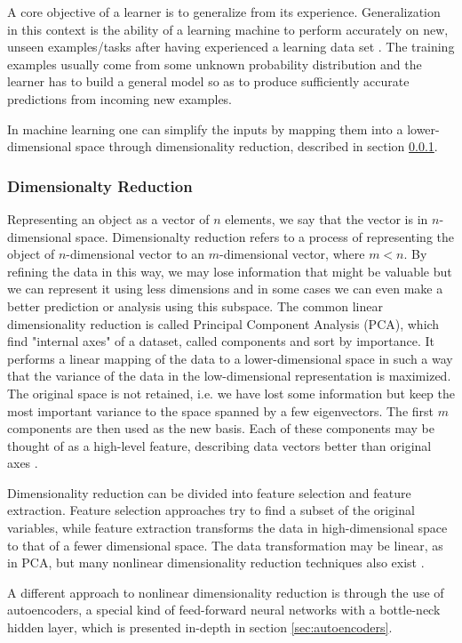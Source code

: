 A core objective of a learner is to generalize from its experience. Generalization in this context is the ability of a learning machine to perform accurately on new, unseen examples/tasks after having experienced a learning data set \cite{bishop, bengio}. The training examples usually come from some unknown probability distribution and the learner has to build a general model so as to produce sufficiently accurate predictions from incoming new examples. 

In machine learning one can simplify the inputs by mapping them into a lower-dimensional space through dimensionality reduction, described in section \ref{sec:dim}.

\subsubsection{Dimensionalty Reduction}
\label{sec:dim}

Representing an object as a vector of $n$ elements, we say that the vector is in $n$-dimensional space. Dimensionalty reduction refers to a process of representing the object of $n$-dimensional vector to an $m$-dimensional vector, where $m < n$. By refining the data in this way, we may lose information that might be valuable but we can represent it using less dimensions and in some cases we can even make a better prediction or analysis using this subspace. The common linear dimensionality reduction is called Principal Component Analysis (PCA), which find "internal axes" of a dataset, called components and sort by importance. It performs a linear mapping of the data to a lower-dimensional space in such a way that the variance of the data in the low-dimensional representation is maximized. The original space is not retained, i.e. we have lost some information but keep the most important variance to the space spanned by a few eigenvectors. The first $m$ components are then used as the new basis. Each of these components may be thought of as a high-level feature, describing data vectors better than original axes \cite{dr}.

Dimensionality reduction can be divided into feature selection and feature extraction. Feature selection approaches try to find a subset of the original variables, while feature extraction transforms the data in high-dimensional space to that of a fewer dimensional space. The data transformation may be linear, as in PCA, but many nonlinear dimensionality reduction techniques also exist \cite{samet}. 

A different approach to nonlinear dimensionality reduction is through the use of autoencoders, a special kind of feed-forward neural networks with a bottle-neck hidden layer, which is presented in-depth in section \ref{sec:autoencoders}.

